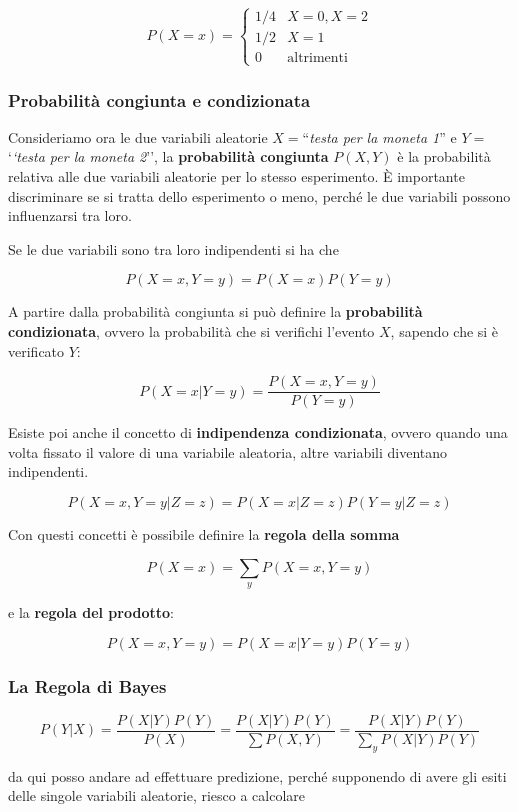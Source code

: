 $$
P(X = x) = \begin{cases}
1/4 &X=0, X=2 \\
1/2 &X=1 \\
0 &\text{altrimenti}
\end{cases}
$$

\subsubsection{Probabilità congiunta e condizionata}

Consideriamo ora le due variabili aleatorie $X =$``\textit{testa per la moneta 1}'' e $Y =$`\textit{`testa per la moneta 2}'', la \textbf{probabilità congiunta} $P(X,Y)$ è la probabilità relativa alle due variabili aleatorie per lo stesso esperimento. \`E importante discriminare se si tratta dello esperimento o meno, perché le due variabili possono influenzarsi tra loro.

Se le due variabili sono tra loro indipendenti si ha che

$$
P(X=x,Y=y) = P(X=x)P(Y=y)
$$

\noindent A partire dalla probabilità congiunta si può definire la \textbf{probabilità condizionata}, ovvero la probabilità che si verifichi l'evento $X$, sapendo che si è verificato $Y$:

$$
P(X =x| Y=y) = \frac{P(X=x,Y=y)}{P(Y=y)}
$$

\noindent Esiste poi anche il concetto di \textbf{indipendenza condizionata}, ovvero quando una volta fissato il valore di una variabile aleatoria, altre variabili diventano indipendenti.

$$
P(X=x,Y=y| Z=z) = P(X=x|Z=z) P(Y=y|Z=z)
$$

\noindent Con questi concetti è possibile definire la \textbf{regola della somma}

$$
P(X=x) = \sum\limits_{y} P(X=x,Y=y)
$$

\noindent e la \textbf{regola del prodotto}:

$$
P(X=x,Y=y) = P(X=x|Y=y)P(Y=y)
$$

\subsubsection{La Regola di Bayes}

$$
P(Y | X) = \frac{P(X | Y)P(Y)}{P(X)} = \frac{P(X | Y)P(Y)}{\sum P(X,Y)} = \frac{P(X | Y)P(Y)}{\sum_y P(X|Y)P(Y)}
$$

\noindent da qui posso andare ad effettuare predizione, perché supponendo di avere gli esiti delle singole variabili aleatorie, riesco a calcolare

